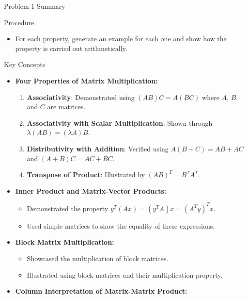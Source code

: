 \begin{summary}{Problem 1 Summary}
    \begin{statement}{Procedure}
        \begin{itemize}
            \item For each property, generate an example for each one and show how the property is carried out arithmetically.
        \end{itemize}
    \end{statement}
    \begin{statement}{Key Concepts}
        \begin{itemize}
            \item \textbf{Four Properties of Matrix Multiplication:}
            \begin{enumerate}
                \item \textbf{Associativity}: Demonstrated using $(AB)C = A(BC)$ where $A$, $B$, and $C$ are matrices.
                \item \textbf{Associativity with Scalar Multiplication}: Shown through $\lambda(AB) = (\lambda A)B$.
                \item \textbf{Distributivity with Addition}: Verified using $A(B + C) = AB + AC$ and $(A + B)C = AC + BC$.
                \item \textbf{Transpose of Product}: Illustrated by $(AB)^T = B^T A^T$.
            \end{enumerate}
            \item \textbf{Inner Product and Matrix-Vector Products:}
            \begin{itemize}
                \item Demonstrated the property $y^T(Ax) = (y^T A)x = (A^T y)^T x$.
                \item Used simple matrices to show the equality of these expressions.
            \end{itemize}
            \item \textbf{Block Matrix Multiplication:}
            \begin{itemize}
                \item Showcased the multiplication of block matrices.
                \item Illustrated using block matrices and their multiplication property.
            \end{itemize}
            \item \textbf{Column Interpretation of Matrix-Matrix Product:}
            \begin{itemize}

\end{itemize}
\end{itemize}
\end{statement}
\end{summary}
